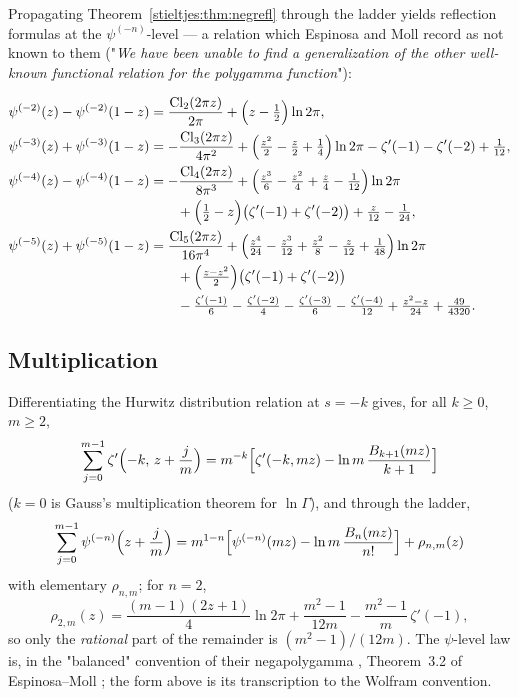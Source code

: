 Propagating Theorem~\ref{stieltjes:thm:negrefl} through the ladder yields reflection
formulas at the $\psi^{(-n)}$-level — a relation which Espinosa and Moll
\cite{stieltjes:EspinosaMoll04} record as not known to them ("\emph{We have been
unable to find a generalization of the other well-known functional
relation for the polygamma function}"):

\begin{theorem}\label{stieltjes:thm:psirefl}
\begin{align*}
\psi^{(-2)}(z)-\psi^{(-2)}(1-z)
&=\frac{\operatorname{Cl}_2(2\pi z)}{2\pi}
+\Bigl(z-\tfrac12\Bigr)\ln2\pi,\\
\psi^{(-3)}(z)+\psi^{(-3)}(1-z)
&=-\frac{\operatorname{Cl}_3(2\pi z)}{4\pi^2}
+\Bigl(\tfrac{z^2}{2}-\tfrac{z}{2}+\tfrac14\Bigr)\ln2\pi
-\zeta'(-1)-\zeta'(-2)+\tfrac1{12},\\
\psi^{(-4)}(z)-\psi^{(-4)}(1-z)
&=-\frac{\operatorname{Cl}_4(2\pi z)}{8\pi^3}
+\Bigl(\tfrac{z^3}{6}-\tfrac{z^2}{4}+\tfrac{z}{4}-\tfrac1{12}\Bigr)\ln2\pi\\
&\qquad+\Bigl(\tfrac12-z\Bigr)\bigl(\zeta'(-1)+\zeta'(-2)\bigr)
+\tfrac{z}{12}-\tfrac1{24},\\
\psi^{(-5)}(z)+\psi^{(-5)}(1-z)
&=\frac{\operatorname{Cl}_5(2\pi z)}{16\pi^4}
+\Bigl(\tfrac{z^4}{24}-\tfrac{z^3}{12}+\tfrac{z^2}{8}-\tfrac{z}{12}
+\tfrac1{48}\Bigr)\ln2\pi\\
&\qquad+\Bigl(\tfrac{z-z^2}{2}\Bigr)\bigl(\zeta'(-1)+\zeta'(-2)\bigr)\\
&\qquad-\tfrac{\zeta'(-1)}{6}-\tfrac{\zeta'(-2)}{4}-\tfrac{\zeta'(-3)}{6}
-\tfrac{\zeta'(-4)}{12}
+\tfrac{z^2-z}{24}+\tfrac{49}{4320}.
\end{align*}
\end{theorem}

\subsection{Multiplication}

Differentiating the Hurwitz distribution relation at $s=-k$ gives, for all
$k\ge0$, $m\ge2$,
\begin{equation}\label{stieltjes:eq:negmult}
\sum_{j=0}^{m-1}\zeta'\Bigl(-k,\,z+\frac jm\Bigr)
=m^{-k}\Bigl[\zeta'(-k,mz)-\ln m\,\frac{B_{k+1}(mz)}{k+1}\Bigr]
\end{equation}
($k=0$ is Gauss's multiplication theorem for $\ln\Gamma$), and through the
ladder,
\[
\sum_{j=0}^{m-1}\psi^{(-n)}\Bigl(z+\frac jm\Bigr)
=m^{1-n}\Bigl[\psi^{(-n)}(mz)-\ln m\,\frac{B_n(mz)}{n!}\Bigr]
+\rho_{n,m}(z)
\]
with elementary $\rho_{n,m}$; for $n=2$,
\[
\rho_{2,m}(z)=\frac{(m-1)(2z+1)}4\ln2\pi+\frac{m^2-1}{12m}
-\frac{m^2-1}{m}\,\zeta'(-1),
\]
so only the \emph{rational} part of the remainder is $(m^2-1)/(12m)$. The
$\psi$-level law is, in the "balanced" convention of their negapolygamma
\cite{stieltjes:EspinosaMoll2}, Theorem~3.2 of Espinosa--Moll \cite{stieltjes:EspinosaMoll04};
the form above is its transcription to the Wolfram convention.

